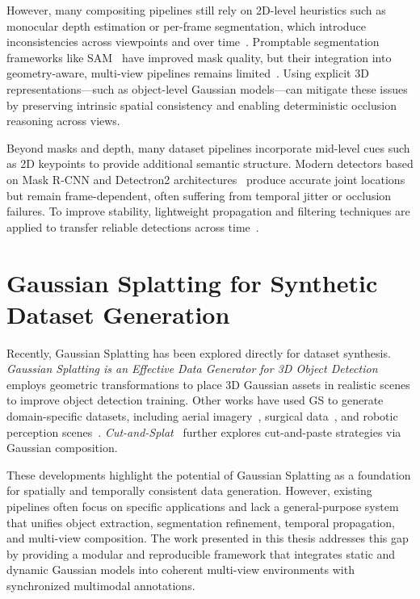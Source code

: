 However, many compositing pipelines still rely on 2D-level heuristics such as monocular depth estimation or per-frame segmentation, which introduce inconsistencies across viewpoints and over time~\cite{InpaintingLimitations2019,MonoDepthLimitations2018}. 
Promptable segmentation frameworks like SAM~\cite{Kirillov2023} have improved mask quality, but their integration into geometry-aware, multi-view pipelines remains limited~\cite{MaskPropagation2019}. 
Using explicit 3D representations—such as object-level Gaussian models—can mitigate these issues by preserving intrinsic spatial consistency and enabling deterministic occlusion reasoning across views.

Beyond masks and depth, many dataset pipelines incorporate mid-level cues such as 2D keypoints to provide additional semantic structure. 
Modern detectors based on Mask R-CNN and Detectron2 architectures~\cite{He2017MaskRCNN,Detectron22020} produce accurate joint locations but remain frame-dependent, often suffering from temporal jitter or occlusion failures. 
To improve stability, lightweight propagation and filtering techniques are applied to transfer reliable detections across time~\cite{MaskPropagation2019}. 

\section{Gaussian Splatting for Synthetic Dataset Generation}

Recently, Gaussian Splatting has been explored directly for dataset synthesis. 
\textit{Gaussian Splatting is an Effective Data Generator for 3D Object Detection}~\cite{zanjani2025gaussiansplattingeffectivedata} employs geometric transformations to place 3D Gaussian assets in realistic scenes to improve object detection training. 
Other works have used GS to generate domain-specific datasets, including aerial imagery~\cite{SyntheticDrone2023}, surgical data~\cite{SurgicalGS2023}, and robotic perception scenes~\cite{MobileRobotsGS2024}. 
\textit{Cut-and-Splat}~\cite{CutAndSplat2024} further explores cut-and-paste strategies via Gaussian composition.

These developments highlight the potential of Gaussian Splatting as a foundation for spatially and temporally consistent data generation.
However, existing pipelines often focus on specific applications and lack a general-purpose system that unifies object extraction, segmentation refinement, temporal propagation, and multi-view composition. 
The work presented in this thesis addresses this gap by providing a modular and reproducible framework that integrates static and dynamic Gaussian models into coherent multi-view environments with synchronized multimodal annotations.







